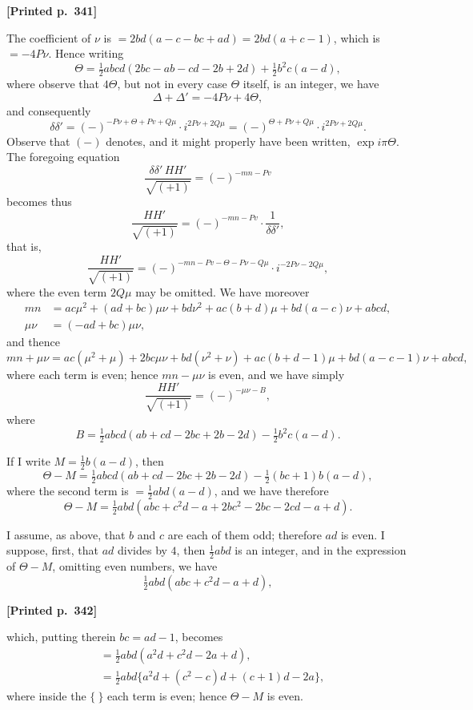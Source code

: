 \documentclass[11pt]{article}
\begin{document}
\medskip

\noindent\textbf{[Printed p.~341]}\hfill

\noindent The coefficient of $\nu$ is $= 2bd(a - c - bc + ad) = 2bd(a + c - 1)$, which is $= -4P\nu$. Hence writing
\[
\Theta = \tfrac{1}{2}abcd(2bc - ab - cd - 2b + 2d) + \tfrac{1}{2}b^{2}c(a - d),
\]
where observe that $4\Theta$, but not in every case $\Theta$ itself, is an integer, we have
\[
\Delta + \Delta' = -4P\nu + 4\Theta,
\]
and consequently
\[
\delta\delta' = (-)^{-P\nu + \Theta + Pv + Q\mu} \cdot i^{2P\nu + 2Q\mu} = (-)^{\Theta + P\nu + Q\mu} \cdot i^{2P\nu + 2Q\mu}.
\]
Observe that $(-)$ denotes, and it might properly have been written, $\exp i\pi\Theta$. The foregoing equation
\[
\frac{\delta\delta'\,HH'}{\sqrt{(+1)}} = (-)^{-mn - Pv}
\]
becomes thus
\[
\frac{HH'}{\sqrt{(+1)}} = (-)^{-mn - Pv} \cdot \frac{1}{\delta\delta'},
\]
that is,
\[
\frac{HH'}{\sqrt{(+1)}} = (-)^{-mn - Pv - \Theta - P\nu - Q\mu} \cdot i^{-2P\nu - 2Q\mu},
\]
where the even term $2Q\mu$ may be omitted. We have moreover
\begin{align*}
mn &= ac\mu^{2} + (ad + bc)\mu\nu + bd\nu^{2} + ac(b + d)\mu + bd(a - c)\nu + abcd, \\
\mu\nu &= (-ad + bc)\mu\nu,
\end{align*}
and thence
\[
mn + \mu\nu = ac(\mu^{2} + \mu) + 2bc\mu\nu + bd(\nu^{2} + \nu) + ac(b + d - 1)\mu + bd(a - c - 1)\nu + abcd,
\]
where each term is even; hence $mn - \mu\nu$ is even, and we have simply
\[
\frac{HH'}{\sqrt{(+1)}} = (-)^{-\mu\nu - B},
\]
where
\[
B = \tfrac{1}{2}abcd(ab + cd - 2bc + 2b - 2d) - \tfrac{1}{2}b^{2}c(a - d).
\]

If I write $M = \tfrac{1}{2}b(a - d)$, then
\[
\Theta - M = \tfrac{1}{2}abcd(ab + cd - 2bc + 2b - 2d) - \tfrac{1}{2}(bc + 1)b(a - d),
\]
where the second term is $= \tfrac{1}{2}abd(a - d)$, and we have therefore
\[
\Theta - M = \tfrac{1}{2}abd(abc + c^{2}d - a + 2bc^{2} - 2bc - 2cd - a + d).
\]

I assume, as above, that $b$ and $c$ are each of them odd; therefore $ad$ is even. I suppose, first, that $ad$ divides by $4$, then $\tfrac{1}{2}abd$ is an integer, and in the expression of $\Theta - M$, omitting even numbers, we have
\[
\tfrac{1}{2}abd(abc + c^{2}d - a + d),
\]

\medskip

\noindent\textbf{[Printed p.~342]}\hfill

\noindent which, putting therein $bc = ad - 1$, becomes
\begin{align*}
&= \tfrac{1}{2}abd(a^{2}d + c^{2}d - 2a + d), \\
&= \tfrac{1}{2}abd\bigl\{a^{2}d + (c^{2} - c)d + (c + 1)d - 2a\bigr\},
\end{align*}
where inside the $\{\ \}$ each term is even; hence $\Theta - M$ is even.
\end{document}
